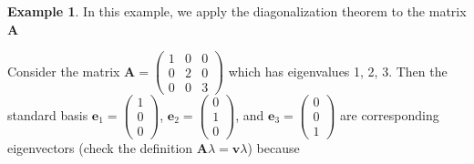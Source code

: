 \documentclass[
]{book}
\theoremstyle{definition}
\theoremstyle{definition}
\newtheorem{example}{Example}[chapter]
\theoremstyle{definition}
\theoremstyle{definition}
\theoremstyle{remark}
\begin{document}
\begin{example}
In this example, we apply the diagonalization theorem to the matrix \(\mathbf{A}\)

Consider the matrix \(\mathbf{A} = \begin{pmatrix} 1 & 0 & 0 \\ 0 & 2 & 0 \\ 0 & 0 & 3 \end{pmatrix}\) which has eigenvalues 1, 2, 3. Then the standard basis \(\mathbf{e}_1 = \begin{pmatrix} 1 \\ 0 \\ 0 \end{pmatrix}\), \(\mathbf{e}_2 = \begin{pmatrix} 0 \\ 1 \\ 0 \end{pmatrix}\), and \(\mathbf{e}_3 = \begin{pmatrix} 0 \\ 0 \\ 1 \end{pmatrix}\) are corresponding eigenvectors (check the definition \(\mathbf{A} \lambda = \mathbf{v} \lambda\)) because


\end{example}
\end{document}
